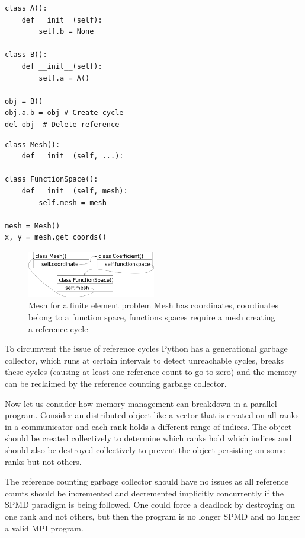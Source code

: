 \documentclass[10pt,journal,compsoc]{IEEEtran}
\begin{document}
\lstset{language=python}
\begin{lstlisting}[float={t}, caption={Example of simple reference cycle}, label={lst:cycle}]
class A():
	def __init__(self):
		self.b = None

class B():
	def __init__(self):
		self.a = A()
		
obj = B()
obj.a.b = obj # Create cycle
del obj  # Delete reference
\end{lstlisting}

\begin{lstlisting}[float={t}, caption={Example of simple reference cycle}, label={lst:mesh}]
class Mesh():
	def __init__(self, ...):

class FunctionSpace():
	def __init__(self, mesh):
		self.mesh = mesh
		
mesh = Mesh()
x, y = mesh.get_coords()
\end{lstlisting}

\begin{figure}
	\includegraphics[width=0.5\textwidth]{gc_real/4.png}
	\caption{Mesh for a finite element problem Mesh has coordinates, coordinates belong to a function space, functions spaces require a mesh creating a reference cycle}
	\label{fig:mesh_ref_cycle}
\end{figure}

To circumvent the issue of reference cycles Python has a generational garbage collector, which runs at certain intervals to detect unreachable cycles, breaks these cycles (causing at least one reference count to go to zero) and the memory can be reclaimed by the reference counting garbage collector.

Now let us consider how memory management can breakdown in a parallel program. Consider an distributed object like a vector that is created on all ranks in a communicator and each rank holds a different range of indices. The object should be created collectively to determine which ranks hold which indices and should also be destroyed collectively to prevent the object persisting on some ranks but not others.

The reference counting garbage collector should have no issues as all reference counts should be incremented and decremented implicitly concurrently if the SPMD paradigm is being followed. One could force a deadlock by destroying on one rank and not others, but then the program is no longer SPMD and no longer a valid MPI program.
\end{document}
